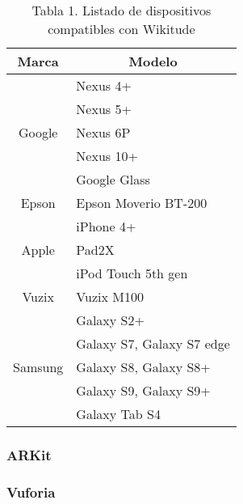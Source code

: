 \begin{table}[]
	\begin{tabular}{|c|l|}
		\hline
		\textbf{Marca}              & \multicolumn{1}{c|}{\textbf{Modelo}}               \\ \hline
		\multirow{5}{*}{Google}     & Nexus 4+                                            \\ \cline{2-2} 																	  
		& Nexus 5+                                           	\\ \cline{2-2} 
		& Nexus 6P                                           	\\ \cline{2-2} 
		& Nexus 10+                                          	\\ \cline{2-2} 
    	& Google Glass                                       	\\ \hline
		\multirow{1}{*}{Epson} & Epson Moverio BT-200        	\\ \cline{2-2} 
		\cline{2-2}
		\multirow{3}{*}{Apple}     & iPhone 4+               	\\ \cline{2-2} 
		\cline{2-2} 																     
	    & Pad2X			                                    	\\ \cline{2-2} 
		& iPod Touch 5th gen                                 	\\ \hline
		\multirow{1}{*}{Vuzix}         & Vuzix M100          	\\ \cline{2-2}
		\cline{2-2} 																      
		\multirow{5}{*}{Samsung} 	   & Galaxy S2+           	\\ \cline{2-2} 
		& Galaxy S7, Galaxy S7 edge                          	\\ \cline{2-2} 
		& Galaxy S8, Galaxy S8+                              	\\ \cline{2-2} 
		& Galaxy S9, Galaxy S9+                              	\\ \cline{2-2} 
		& Galaxy Tab S4                                      	\\ \hline
	\end{tabular}
	\captionsetup{justification=centering}
	\caption*{Tabla 1. Listado de dispositivos compatibles con Wikitude}
\end{table}

\subsubsection{ARKit}
\noindent
\subsubsection{Vuforia}
\noindent
